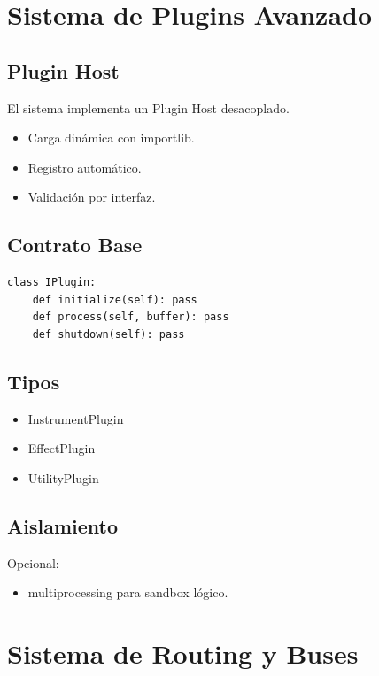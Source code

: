 \documentclass[12pt]{article}
\begin{document}
\section{Sistema de Plugins Avanzado}

\subsection{Plugin Host}

El sistema implementa un Plugin Host desacoplado.

\begin{itemize}
    \item Carga dinámica con importlib.
    \item Registro automático.
    \item Validación por interfaz.
\end{itemize}

\subsection{Contrato Base}

\begin{lstlisting}
class IPlugin:
    def initialize(self): pass
    def process(self, buffer): pass
    def shutdown(self): pass
\end{lstlisting}

\subsection{Tipos}

\begin{itemize}
    \item InstrumentPlugin
    \item EffectPlugin
    \item UtilityPlugin
\end{itemize}

\subsection{Aislamiento}

Opcional:
\begin{itemize}
    \item multiprocessing para sandbox lógico.
\end{itemize}

\section{Sistema de Routing y Buses}
\end{document}
